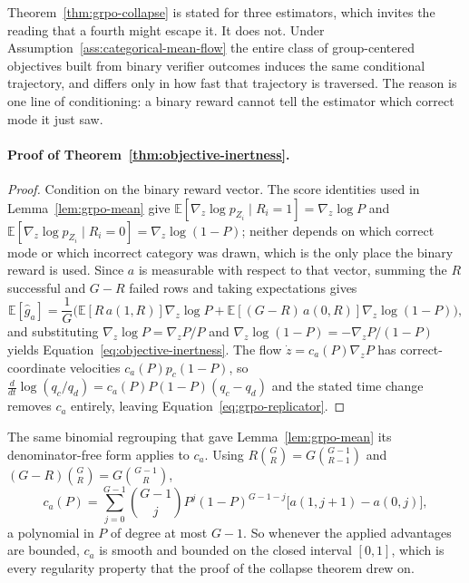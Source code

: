 \documentclass{article}
\newcommand{\1}{\mathbf 1}
\newcommand{\E}{\mathbb E}
\theoremstyle{remark}
\theoremstyle{definition}
\theoremstyle{plain}
\begin{document}
Theorem~\ref{thm:grpo-collapse} is stated for three estimators, which invites
the reading that a fourth might escape it. It does not. Under
Assumption~\ref{ass:categorical-mean-flow} the entire class of group-centered
objectives built from binary verifier outcomes induces the same conditional
trajectory, and differs only in how fast that trajectory is traversed. The
reason is one line of conditioning: a binary reward cannot tell the estimator
which correct mode it just saw.

\paragraph{Proof of Theorem~\ref{thm:objective-inertness}.}

\begin{proof}
Condition on the binary reward vector. The score identities used in
Lemma~\ref{lem:grpo-mean} give
$\E[\nabla_z\log p_{Z_i}\mid R_i=1]=\nabla_z\log P$ and
$\E[\nabla_z\log p_{Z_i}\mid R_i=0]=\nabla_z\log(1-P)$; neither depends on
which correct mode or which incorrect category was drawn, which is the only
place the binary reward is used. Since $a$ is measurable with respect to that
vector, summing the $R$ successful and $G-R$ failed rows and taking
expectations gives
\[
  \E[\widehat g_a]
  =\frac1G\Big(\E[R\,a(1,R)]\nabla_z\log P
   +\E[(G-R)\,a(0,R)]\nabla_z\log(1-P)\Big),
\]
and substituting $\nabla_z\log P=\nabla_zP/P$ and
$\nabla_z\log(1-P)=-\nabla_zP/(1-P)$ yields
Equation~\eqref{eq:objective-inertness}. The flow
$\dot z=c_a(P)\nabla_zP$ has correct-coordinate velocities
$c_a(P)p_c(1-P)$, so $\frac{d}{dt}\log(q_c/q_d)=c_a(P)P(1-P)(q_c-q_d)$ and the
stated time change removes $c_a$ entirely, leaving
Equation~\eqref{eq:grpo-replicator}.
\end{proof}


The same binomial regrouping that gave Lemma~\ref{lem:grpo-mean} its
denominator-free form applies to $c_a$. Using $R\binom GR=G\binom{G-1}{R-1}$
and $(G-R)\binom GR=G\binom{G-1}{R}$,
\begin{equation}
 c_a(P)=\sum_{j=0}^{G-1}\binom{G-1}{j}P^j(1-P)^{G-1-j}
 \big[a(1,j+1)-a(0,j)\big],
 \label{eq:inertness-polynomial}
\end{equation}
a polynomial in $P$ of degree at most $G-1$. So whenever the applied advantages
are bounded, $c_a$ is smooth and bounded on the closed interval $[0,1]$, which
is every regularity property that the proof of the collapse theorem drew on.
\end{document}
